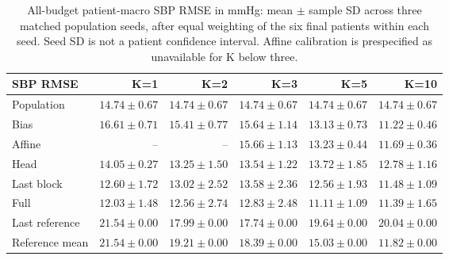 \documentclass[11pt]{article}
\begin{document}
\begin{table}[!htbp]\centering\small
\begin{tabular}{lrrrrr}\toprule
SBP RMSE & K=1 & K=2 & K=3 & K=5 & K=10\\\midrule
Population & $14.74\pm0.67$ & $14.74\pm0.67$ & $14.74\pm0.67$ & $14.74\pm0.67$ & $14.74\pm0.67$\\
Bias & $16.61\pm0.71$ & $15.41\pm0.77$ & $15.64\pm1.14$ & $13.13\pm0.73$ & $11.22\pm0.46$\\
Affine & -- & -- & $15.66\pm1.13$ & $13.23\pm0.44$ & $11.69\pm0.36$\\
Head & $14.05\pm0.27$ & $13.25\pm1.50$ & $13.54\pm1.22$ & $13.72\pm1.85$ & $12.78\pm1.16$\\
Last block & $12.60\pm1.72$ & $13.02\pm2.52$ & $13.58\pm2.36$ & $12.56\pm1.93$ & $11.48\pm1.09$\\
Full & $12.03\pm1.48$ & $12.56\pm2.74$ & $12.83\pm2.48$ & $11.11\pm1.09$ & $11.39\pm1.65$\\
Last reference & $21.54\pm0.00$ & $17.99\pm0.00$ & $17.74\pm0.00$ & $19.64\pm0.00$ & $20.04\pm0.00$\\
Reference mean & $21.54\pm0.00$ & $19.21\pm0.00$ & $18.39\pm0.00$ & $15.03\pm0.00$ & $11.82\pm0.00$\\
\bottomrule\end{tabular}
\caption{All-budget patient-macro SBP RMSE in mmHg: mean $\pm$ sample SD across three matched population seeds, after equal weighting of the six final patients within each seed. Seed SD is not a patient confidence interval. Affine calibration is prespecified as unavailable for K below three.}\end{table}
\end{document}
